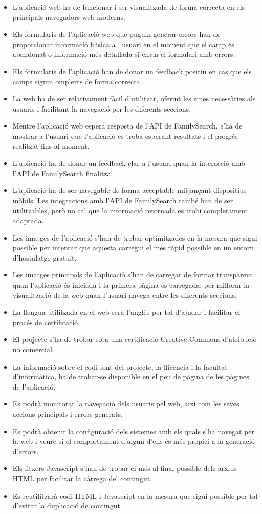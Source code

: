     \begin{itemize}
        \item L'aplicació web ha de funcionar i ser visualitzada de forma correcta en els principals navegadors web moderns.
        \item Els formularis de l'aplicació web que puguin generar errors han de proporcionar informació bàsica a l'usuari en el moment que el camp és abandonat o informació més detallada si envia el formulari amb errors.
        \item Els formularis de l’aplicació han de donar un feedback positiu en cas que els camps siguin omplerts de forma correcta.
        \item La web ha de ser relativament fàcil d'utilitzar, oferint les eines necessàries als usuaris i facilitant la navegació per les diferents seccions.
        \item Mentre l'aplicació web espera resposta de l’API de FamilySearch, s'ha de mostrar a l'usuari que l'aplicació es troba esperant resultats i el progrés rea\-lit\-zat fins al moment.
        \item L'aplicació ha de donar un feedback clar a l'usuari quan la interacció amb l’API de FamilySearch finalitza.
        \item L'aplicació ha de ser navegable de forma acceptable mitjançant dispositius mò\-bils. Les integracions amb l’API de FamilySearch també han de ser utilitzables, però no cal que la informació retornada es trobi completament adaptada.
        \item Les imatges de l'aplicació s'han de trobar optimitzades en la mesura que sigui possible per intentar que aquesta carregui el més ràpid possible en un entorn d'hostalatge gratuït.
        \item Les imatges principals de l'aplicació s'han de carregar de formar transparent quan l'aplicació és iniciada i la primera pàgina és carregada, per millorar la visualització de la web quan l'usuari navega entre les diferents seccions.
        \item La llengua utilitzada en el web serà l'anglès per tal d'ajudar i facilitar el procés de certificació.
        \item El projecte s'ha de trobar sota una certificació Creative Commons d'atribució no comercial.
        \item La informació sobre el codi font del projecte, la llicència i la facultat d'in\-for\-mà\-ti\-ca, ha de trobar-se disponible en el peu de pàgina de les pàgines de l'aplicació.
        \item Es podrà monitorar la navegació dels usuaris pel web, així com les seves accions principals i errors generats.
        \item Es podrà obtenir la configuració dels sistemes amb els quals s'ha navegat per la web i veure si el comportament d'algun d'ells és més propici a la generació d'errors.
        \item Els fitxers Javascript s'han de trobar el més al final possible dels arxius HTML per facilitar la càrrega del contingut.
        \item Es reutilitzarà codi HTML i Javascript en la mesura que sigui possible per tal d'evitar la duplicació de contingut.
    \end{itemize}

